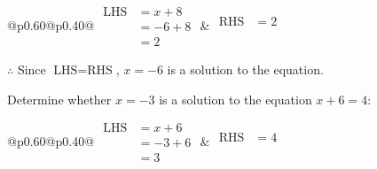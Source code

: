 \documentclass[12pt]{article}
\newcounter{minipagecount}
\begin{document}
\begin{multicols}{2}
\begin{minipage}[t]{0.40\textwidth}
    \noindent
    \renewcommand{\arraystretch}{1.3} %
    \begin{tabular}{@{}p{0.60\linewidth}@{}p{0.40\linewidth}@{}}
        \(\begin{aligned}
            \text{LHS} &= x + 8 \\
                    &= -6 + 8 \\
                    &= 2 
        \end{aligned}\) &
        \(\begin{aligned}
            \text{RHS} &= 2\\
                    & \\
                    &
        \end{aligned}\)
    \end{tabular}
    \renewcommand{\arraystretch}{1.0} %
    \vspace{2pt}  %

    \noindent \(\therefore\) Since \(\text{LHS} = \text{RHS}\), \(x = -6\) is  a solution to the equation.

\end{minipage}

 \vspace*{16pt}
\columnbreak
\noindent{(\theminipagecount)}\hspace{0.1mm} %
\begin{minipage}[t]{0.40\textwidth} %

    \noindent Determine whether \(x = -3\) is a solution to the equation \(x + 6 = 4\):
    \vspace{4pt}  %

    \noindent
    \renewcommand{\arraystretch}{1.3} %
    \begin{tabular}{@{}p{0.60\linewidth}@{}p{0.40\linewidth}@{}}
        \(\begin{aligned}
            \text{LHS} &= x + 6 \\
                    &= -3 + 6 \\
                    &= 3 
        \end{aligned}\) &
        \(\begin{aligned}
            \text{RHS} &= 4\\
                    & \\
                    &
        \end{aligned}\)
    \end{tabular}
    \renewcommand{\arraystretch}{1.0} %
    \vspace{2pt}  %


\end{minipage}
\end{multicols}
\end{document}
